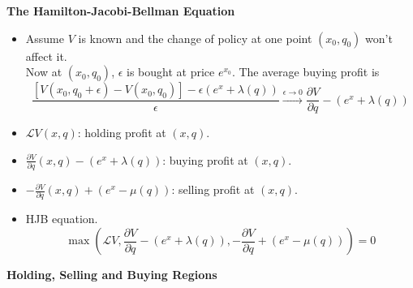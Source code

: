 \documentclass{beamer}
\begin{document}
\begin{frame}
{\bf The Hamilton-Jacobi-Bellman Equation}

\begin{itemize}
\item Assume $V$ is known and the change of policy at one point $(x_0,q_0)$ won't affect it.\\
Now at $(x_0,q_0)$, $\epsilon$ is bought at price $e^{x_0}$. The average buying profit is 
\begin{equation*}
  \frac{\left[V(x_0,q_0 + \epsilon) - V(x_0,q_0)\right] - \epsilon(e^x + \lambda(q))}{\epsilon}
  \stackrel{\epsilon \rightarrow 0}{\longrightarrow} 
  \frac{\partial V}{\partial q} - (e^x + \lambda(q))
\end{equation*}

\item $\mathcal{L}V(x,q)$: holding profit at $(x,q)$.
\item $\frac{\partial V}{\partial q}(x,q) - (e^x + \lambda(q))$: buying profit at $(x,q)$.
\item $-\frac{\partial V}{\partial q}(x,q) + (e^x - \mu(q))$: selling profit at $(x,q)$.

\item HJB equation.
\begin{equation*}
  \max\left( \mathcal{L} V, \frac{\partial V}{\partial q} - (e^x + \lambda(q)), -\frac{\partial V}{\partial q} + (e^x - \mu(q))\right) = 0
\end{equation*}



\end{itemize}

\end{frame}


\begin{frame}
{\bf Holding, Selling and Buying Regions}

\end{frame}
\end{document}
